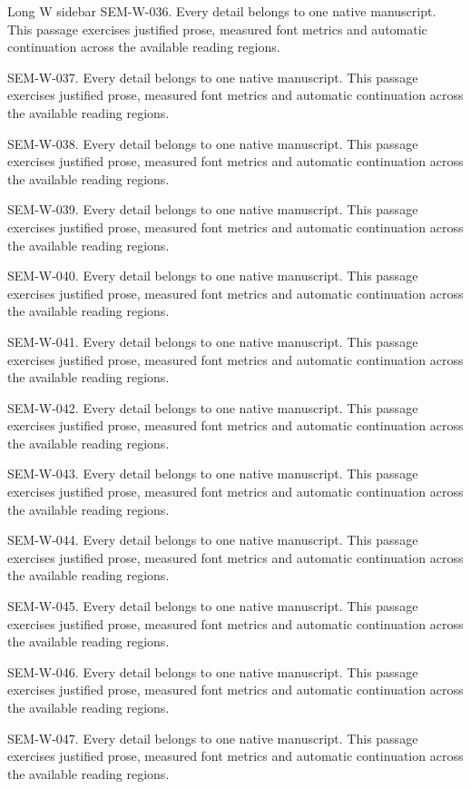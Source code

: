 \begin{m20sidebarwide}[columns=1,id=long-wide1]{Long W sidebar}
SEM-W-036. Every detail belongs to one native manuscript. This passage exercises justified prose, measured font metrics and automatic continuation across the available reading regions.\par
SEM-W-037. Every detail belongs to one native manuscript. This passage exercises justified prose, measured font metrics and automatic continuation across the available reading regions.\par
SEM-W-038. Every detail belongs to one native manuscript. This passage exercises justified prose, measured font metrics and automatic continuation across the available reading regions.\par
SEM-W-039. Every detail belongs to one native manuscript. This passage exercises justified prose, measured font metrics and automatic continuation across the available reading regions.\par
SEM-W-040. Every detail belongs to one native manuscript. This passage exercises justified prose, measured font metrics and automatic continuation across the available reading regions.\par
SEM-W-041. Every detail belongs to one native manuscript. This passage exercises justified prose, measured font metrics and automatic continuation across the available reading regions.\par
SEM-W-042. Every detail belongs to one native manuscript. This passage exercises justified prose, measured font metrics and automatic continuation across the available reading regions.\par
SEM-W-043. Every detail belongs to one native manuscript. This passage exercises justified prose, measured font metrics and automatic continuation across the available reading regions.\par
SEM-W-044. Every detail belongs to one native manuscript. This passage exercises justified prose, measured font metrics and automatic continuation across the available reading regions.\par
SEM-W-045. Every detail belongs to one native manuscript. This passage exercises justified prose, measured font metrics and automatic continuation across the available reading regions.\par
SEM-W-046. Every detail belongs to one native manuscript. This passage exercises justified prose, measured font metrics and automatic continuation across the available reading regions.\par
SEM-W-047. Every detail belongs to one native manuscript. This passage exercises justified prose, measured font metrics and automatic continuation across the available reading regions.\par

\end{m20sidebarwide}
